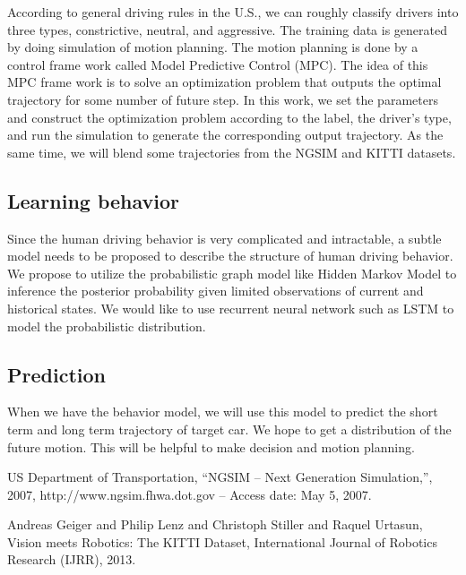 \documentclass[conference]{IEEEtran}
\begin{document}
According to general driving rules in the U.S., we can roughly classify drivers into three types, constrictive, neutral, and aggressive. The training data is generated by doing simulation of motion planning. The motion planning is done by a control frame work called Model Predictive Control (MPC). The idea of this MPC frame work is to solve an optimization problem that outputs the optimal trajectory for some number of future step. In this work, we set the parameters and construct the optimization problem according to the label, the driver's type, and run the simulation to generate the corresponding output trajectory. As the same time, we will blend some trajectories from the NGSIM \cite{b1} and KITTI \cite{b2} datasets.

\subsection{Learning behavior}

Since the human driving behavior is very complicated and intractable, a subtle model needs to be proposed to describe the structure of human driving behavior. We propose to utilize the probabilistic graph model like Hidden Markov Model to inference the posterior probability given limited observations of current and historical states. We would like to use recurrent neural network such as LSTM to model the probabilistic distribution. 

\subsection{Prediction}

When we have the behavior model, we will use this model to predict the short term and long term trajectory of target car. We hope to get a distribution of the future motion. This will be helpful to make decision and motion planning.


\begin{thebibliography}{00}
US Department of Transportation, “NGSIM – Next Generation Simulation,”, 2007,
http://www.ngsim.fhwa.dot.gov – Access date: May 5, 2007.

Andreas Geiger and Philip Lenz and Christoph Stiller and Raquel Urtasun, Vision meets Robotics: The KITTI Dataset, International Journal of Robotics Research (IJRR), 2013.


\end{thebibliography}
\end{document}
